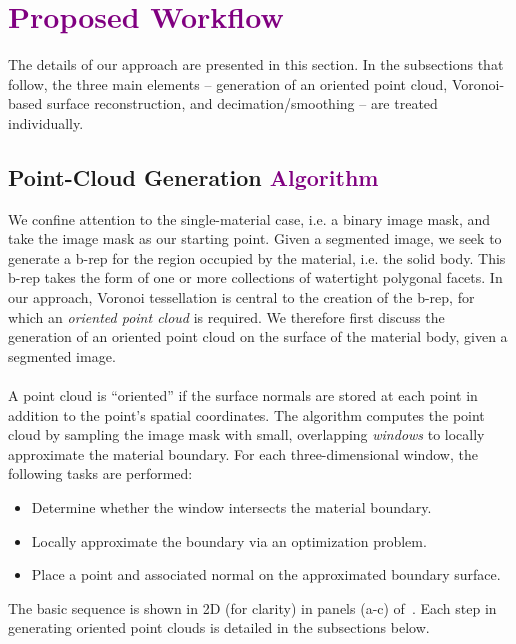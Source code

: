 \section{\textcolor{purple}{Proposed Workflow}}

The details of our approach are presented in this section.  In the subsections that follow, the three main elements -- generation of an oriented point cloud, Voronoi-based surface reconstruction, and decimation/smoothing -- are treated individually.  

\subsection{Point-Cloud Generation \textcolor{purple}{Algorithm}}
\label{Point Cloud Generation}

We confine attention to the single-material case, i.e. a binary image mask, and take the image mask as our starting point.  Given a segmented image, we seek to generate a b-rep for the region occupied by the material, i.e. the solid body.  This b-rep takes the form of one or more collections of watertight polygonal facets.  In our approach, Voronoi tessellation is central to the creation of the b-rep, for which an {\em oriented point cloud} is required.  We therefore first discuss the generation of an oriented point cloud on the surface of the material body, given a segmented image. \\ \\
%
A point cloud is ``oriented'' if the surface normals are stored at each point in addition to the point's spatial coordinates. The algorithm computes the point cloud by sampling the image mask with small, overlapping \textit{windows} to locally approximate the material boundary. For each three-dimensional window, the following tasks are performed:
\vspace{2mm}
\begin{itemize}[noitemsep]
  \item Determine whether the window intersects the material boundary.
  \item Locally approximate the boundary via an optimization problem. 
  \item Place a point and associated normal on the approximated boundary surface.
\end{itemize}
\vspace{2mm}
The basic sequence is shown in 2D (for clarity) in panels (a-c) of~. Each step in generating oriented point clouds is detailed in the subsections below.

